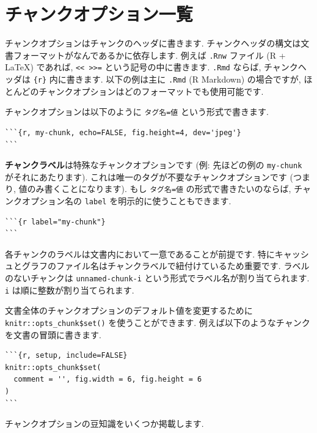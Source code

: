 \documentclass[
  11pt,
  lualatex,ja=standard,jafont=noto]{bxjsreport}
\begin{document}
\hypertarget{chunk-options-full}{%
\section{チャンクオプション一覧}\label{chunk-options-full}}

チャンクオプションはチャンクのヘッダに書きます. チャンクヘッダの構文は文書フォーマットがなんであるかに依存します. 例えば \texttt{.Rnw} ファイル (R + LaTeX) であれば, \texttt{\textless{}\textless{}\ \textgreater{}\textgreater{}=} という記号の中に書きます. \texttt{.Rmd} ならば, チャンクヘッダは \texttt{\textasciigrave{}\textasciigrave{}\textasciigrave{}\{r\}} 内に書きます. 以下の例は主に \texttt{.Rmd} (R Markdown) の場合ですが, ほとんどのチャンクオプションはどのフォーマットでも使用可能です.

チャンクオプションは以下のように \texttt{タグ名=値} という形式で書きます.

\begin{verbatim}
```{r, my-chunk, echo=FALSE, fig.height=4, dev='jpeg'}
```
\end{verbatim}

\textbf{チャンクラベル}は特殊なチャンクオプションです (例: 先ほどの例の \texttt{my-chunk} がそれにあたります). これは唯一のタグが不要なチャンクオプションです (つまり, 値のみ書くことになります). もし \texttt{タグ名=値} の形式で書きたいのならば, チャンクオプション名の \texttt{label} を明示的に使うこともできます.

\begin{verbatim}
```{r label="my-chunk"}
```
\end{verbatim}

各チャンクのラベルは文書内において一意であることが前提です. 特にキャッシュとグラフのファイル名はチャンクラベルで紐付けているため重要です. ラベルのないチャンクは \texttt{unnamed-chunk-i} という形式でラベル名が割り当てられます. \texttt{i} は順に整数が割り当てられます.

文書全体のチャンクオプションのデフォルト値を変更するために \texttt{knitr::opts\_chunk\$set()} を使うことができます. 例えば以下のようなチャンクを文書の冒頭に書きます.

\begin{verbatim}
```{r, setup, include=FALSE}
knitr::opts_chunk$set(
  comment = '', fig.width = 6, fig.height = 6
)
```
\end{verbatim}

チャンクオプションの豆知識をいくつか掲載します.
\end{document}
